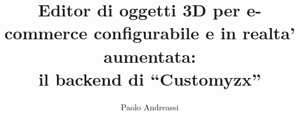 \documentclass{unicam_thesis}
\title{Editor di oggetti 3D per e-commerce configurabile e in realta' aumentata: \\ il backend di “Customyzx”}
\author{Paolo Andreassi}%
\theoremstyle{definition} \newtheorem{esempio}{Esempio}[chapter]
\theoremstyle{definition}
\begin{document}
\maketitle

\tableofcontents
\lstlistoflistings
\listoffigures
\listoftables








\appendix


\printbibliography

\printindex
%
\end{document}
